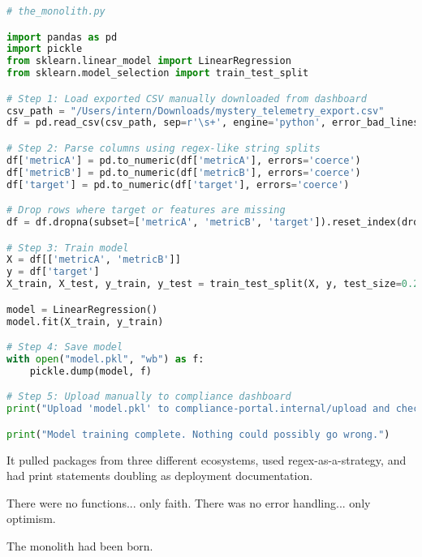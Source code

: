 \begin{lstlisting}[language=Python]
# the_monolith.py

import pandas as pd
import pickle
from sklearn.linear_model import LinearRegression
from sklearn.model_selection import train_test_split

# Step 1: Load exported CSV manually downloaded from dashboard
csv_path = "/Users/intern/Downloads/mystery_telemetry_export.csv"
df = pd.read_csv(csv_path, sep=r'\s+', engine='python', error_bad_lines=False)

# Step 2: Parse columns using regex-like string splits
df['metricA'] = pd.to_numeric(df['metricA'], errors='coerce')
df['metricB'] = pd.to_numeric(df['metricB'], errors='coerce')
df['target'] = pd.to_numeric(df['target'], errors='coerce')

# Drop rows where target or features are missing
df = df.dropna(subset=['metricA', 'metricB', 'target']).reset_index(drop=True)

# Step 3: Train model
X = df[['metricA', 'metricB']]
y = df['target']
X_train, X_test, y_train, y_test = train_test_split(X, y, test_size=0.2)

model = LinearRegression()
model.fit(X_train, y_train)

# Step 4: Save model
with open("model.pkl", "wb") as f:
    pickle.dump(model, f)

# Step 5: Upload manually to compliance dashboard
print("Upload 'model.pkl' to compliance-portal.internal/upload and check the box manually.")

print("Model training complete. Nothing could possibly go wrong.")
\end{lstlisting}

It pulled packages from three different ecosystems, used regex-as-a-strategy, and had print statements doubling as deployment documentation.

There were no functions... only faith.  
There was no error handling... only optimism.

The monolith had been born.

